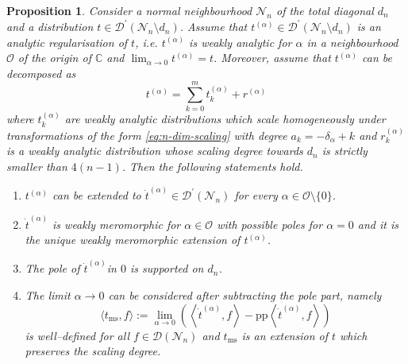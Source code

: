 \documentclass[a4paper,10pt,twoside]{article}
\numberwithin{equation}{section}
\newcounter{and}
\def\bbC{\mathbb{C}}
\def\N{\mathcal{N}}
\def\D{\mathcal{D}}
\def\OO{\mathcal{O}}
\def\pp{\mathrm{pp}}
\def\ms{\mathrm{ms}}
\theoremstyle{plain}
\newtheorem{propo}[theo]{Proposition}
\theoremstyle{definition}
\begin{document}
\begin{propo}\label{pr:regularisation} Consider a normal neighbourhood $\N_n$ of the total diagonal $d_n$ and a distribution $t\in\D^\prime(\N_n\setminus d_n)$. Assume that $t^{(\alpha)}\in\D^\prime(\N_n\setminus d_n)$ is an analytic regularisation of $t$, i.e. $t^{(\alpha)}$ is weakly analytic for $\alpha$ in a neighbourhood $\OO$ of the origin of $\bbC$ and $\lim_{\alpha\to 0}t^{(\alpha)}=t$. Moreover, assume that $t^{(\alpha)}$ can be decomposed as 
\[
t^{(\alpha)} = \sum_{k=0}^m t^{(\alpha)}_k    + r^{(\alpha)}
\]
where $t^{(\alpha)}_k$ are weakly analytic distributions which scale homogeneously under transformations of the form \eqref{eq:n-dim-scaling} with degree $a_k = -\delta_\alpha + k$ and $r^{(\alpha)}_k$ is a weakly analytic distribution whose scaling degree towards $d_n$ is strictly smaller than $4(n-1)$. Then the following statements hold.
\begin{enumerate}
\item $t^{(\alpha)}$ can be extended to $\dot{t}^{(\alpha)}\in \D^\prime(\N_n)$ for every $\alpha\in \OO\setminus\{0\}$.
\item $\dot{t}^{(\alpha)}$ is weakly meromorphic for $\alpha\in\OO$ with possible poles for $\alpha=0$ and it is the unique weakly meromorphic extension of $t^{(\alpha)}$. 
\item The pole of $\dot{t}^{(\alpha)}$in $0$ is supported on $d_n$.
\item The limit $\alpha\to 0$ can be considered after subtracting the pole part, namely
\[
\langle t_\ms, f \rangle:= \lim_{\alpha\to 0 } \left(\left\langle \dot{t}^{(\alpha)}, f \right\rangle - \pp \left\langle \dot{t}^{(\alpha)}, f \right\rangle  \right)
\]
is well--defined for all $f\in\D(\N_n)$ and $t_\ms$ is an extension of $t$ which preserves the scaling degree.
\end{enumerate}
\end{propo}
\end{document}
